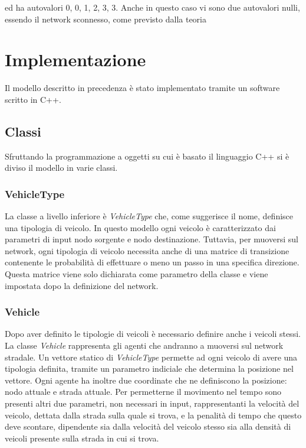 \documentclass[../main.tex]{subfiles}un
\begin{document}
ed ha autovalori 0, 0, 1, 2, 3, 3.
Anche in questo caso vi sono due autovalori nulli, essendo il network sconnesso, come previsto dalla teoria

\chapter{Implementazione}
Il modello descritto in precedenza \`e stato implementato tramite un software scritto in C++.
\section{Classi}
Sfruttando la programmazione a oggetti su cui \`e basato il linguaggio C++ si \`e diviso il modello in varie classi.
\subsection{VehicleType}
La classe a livello inferiore \`e \emph{VehicleType} che, come suggerisce il nome, definisce una tipologia di veicolo.
In questo modello ogni veicolo \`e caratterizzato dai parametri di input nodo sorgente e nodo destinazione.
Tuttavia, per muoversi sul network, ogni tipologia di veicolo necessita anche di una matrice di transizione contenente le probabilità di effettuare o meno un passo in una specifica direzione.
Questa matrice viene solo dichiarata come parametro della classe e viene impostata dopo la definizione del network.
\subsection{Vehicle}
Dopo aver definito le tipologie di veicoli \`e necessario definire anche i veicoli stessi.
La classe \emph{Vehicle} rappresenta gli agenti che andranno a muoversi sul network stradale.
Un vettore statico di \emph{VehicleType} permette ad ogni veicolo di avere una tipologia definita, tramite un parametro indiciale che determina la posizione nel vettore.
Ogni agente ha inoltre due coordinate che ne definiscono la posizione: nodo attuale e strada attuale.
Per permetterne il movimento nel tempo sono presenti altri due parametri, non necessari in input, rappresentanti la velocità del veicolo, dettata dalla strada sulla quale si trova, e la penalità di tempo che questo deve scontare, dipendente sia dalla velocità del veicolo stesso sia alla densità di veicoli presente sulla strada in cui si trova.
\end{document}
